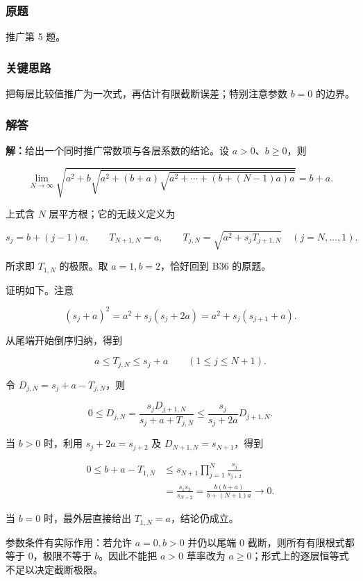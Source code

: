 \documentclass[11pt,a4paper]{article}
\begin{document}
\subsubsection{原题}\label{ux539fux9898-4}

推广第 5 题。

\subsubsection{关键思路}\label{ux5173ux952eux601dux8def-4}

把每层比较值推广为一次式，再估计有限截断误差；特别注意参数 \(b=0\)
的边界。

\subsubsection{解答}\label{ux89e3ux7b54-4}

\textbf{解：}给出一个同时推广常数项与各层系数的结论。设
\(a>0\)、\(b\ge0\)，则

\[
\boxed{\lim_{N\to\infty}
\sqrt{a^2+b\sqrt{a^2+(b+a)\sqrt{a^2+\cdots+(b+(N-1)a)a}}}=b+a.}
\]

上式含 \(N\) 层平方根；它的无歧义定义为

\[
s_j=b+(j-1)a,\qquad T_{N+1,N}=a,\qquad
T_{j,N}=\sqrt{a^2+s_jT_{j+1,N}}\quad(j=N,\ldots,1).
\]

所求即 \(T_{1,N}\) 的极限。取 \(a=1,b=2\)，恰好回到 B36 的原题。

证明如下。注意

\[
(s_j+a)^2=a^2+s_j(s_j+2a)=a^2+s_j(s_{j+1}+a).
\]

从尾端开始倒序归纳，得到

\[
a\le T_{j,N}\le s_j+a\qquad(1\le j\le N+1).
\]

令 \(D_{j,N}=s_j+a-T_{j,N}\)，则

\[
0\le D_{j,N}
=\frac{s_jD_{j+1,N}}{s_j+a+T_{j,N}}
\le\frac{s_j}{s_j+2a}D_{j+1,N}.
\]

当 \(b>0\) 时，利用 \(s_j+2a=s_{j+2}\) 及 \(D_{N+1,N}=s_{N+1}\)，得到

\[
\begin{aligned}
0\le b+a-T_{1,N}
&\le s_{N+1}\prod_{j=1}^{N}\frac{s_j}{s_{j+2}}\\
&=\frac{s_1s_2}{s_{N+2}}
=\frac{b(b+a)}{b+(N+1)a}\longrightarrow0.
\end{aligned}
\]

当 \(b=0\) 时，最外层直接给出 \(T_{1,N}=a\)，结论仍成立。

参数条件有实际作用：若允许 \(a=0,b>0\) 并仍以尾端 \(0\)
截断，则所有有限根式都等于 \(0\)，极限不等于 \(b\)。因此不能把 \(a>0\)
草率改为 \(a\ge0\)；形式上的逐层恒等式不足以决定截断极限。
\end{document}
